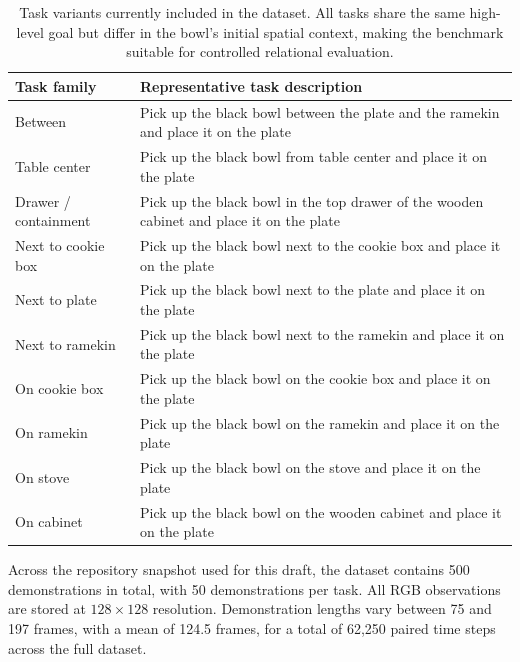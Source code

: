 \documentclass{article}
\begin{document}
\begin{table}[t]
    \caption{Task variants currently included in the dataset. All tasks share the same high-level goal but differ in the bowl's initial spatial context, making the benchmark suitable for controlled relational evaluation.}
    \label{tab:tasks}
    \centering
    \begin{tabularx}{\linewidth}{lX}
        \toprule
        Task family & Representative task description \\
        \midrule
        Between & Pick up the black bowl between the plate and the ramekin and place it on the plate \\
        Table center & Pick up the black bowl from table center and place it on the plate \\
        Drawer / containment & Pick up the black bowl in the top drawer of the wooden cabinet and place it on the plate \\
        Next to cookie box & Pick up the black bowl next to the cookie box and place it on the plate \\
        Next to plate & Pick up the black bowl next to the plate and place it on the plate \\
        Next to ramekin & Pick up the black bowl next to the ramekin and place it on the plate \\
        On cookie box & Pick up the black bowl on the cookie box and place it on the plate \\
        On ramekin & Pick up the black bowl on the ramekin and place it on the plate \\
        On stove & Pick up the black bowl on the stove and place it on the plate \\
        On cabinet & Pick up the black bowl on the wooden cabinet and place it on the plate \\
        \bottomrule
    \end{tabularx}
\end{table}

Across the repository snapshot used for this draft, the dataset contains 500 demonstrations in total, with 50 demonstrations per task. All RGB observations are stored at $128 \times 128$ resolution. Demonstration lengths vary between 75 and 197 frames, with a mean of 124.5 frames, for a total of 62,250 paired time steps across the full dataset.
\end{document}
